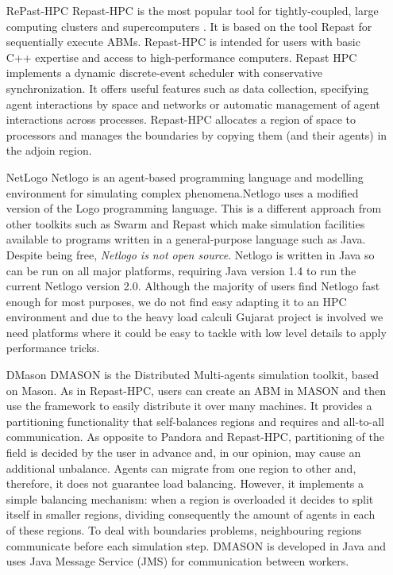 \documentclass[11pt,oneside,a4paper,openright]{report}
\begin{document}
\begin{enumerate}
\renewcommand{\labelitemi}{$\bullet$}
\renewcommand{\labelitemii}{$\cdot$}
\item[RePast-HPC]
Repast-HPC is the most popular tool for tightly-coupled, large computing clusters and
supercomputers \cite{CollierNorth2012}. It is based on the tool Repast for sequentially execute ABMs.
Repast-HPC is intended for users with basic C++ expertise and access to high-performance computers.
Repast HPC implements a dynamic discrete-event scheduler with conservative synchronization. It offers
useful features such as data collection, specifying agent interactions by space and networks or automatic
management of agent interactions across processes. Repast-HPC allocates a region of space to processors
and manages the boundaries by copying them (and their agents) in the adjoin region. 
\\
\item[NetLogo]
Netlogo\cite{netlogoCite} is an agent-based programming language and modelling environment for
simulating complex phenomena.Netlogo uses a modified version of the Logo programming language.
This is a different approach from other toolkits such as Swarm and Repast
which make simulation facilities available to programs written in a general-purpose
language such as Java. Despite being free, \emph{Netlogo is not open source}. Netlogo is
written in Java so can be run on all major platforms, requiring Java version 1.4 to
run the current Netlogo version 2.0. Although the majority of users find Netlogo
fast enough for most purposes, we do not find easy adapting it to an HPC environment and
due to the heavy load calculi Gujarat project is involved we need platforms where it could be
easy to tackle with low level details to apply performance tricks.
\\
\item[DMason]
DMASON is the Distributed Multi-agents simulation toolkit, based on Mason. As in Repast-HPC, users can create an ABM in MASON and then use the framework to easily distribute it over many machines. It provides a partitioning functionality that self-balances regions and requires and all-to-all communication. As opposite to Pandora and Repast-HPC, partitioning of the field is decided by the user in advance and, in our opinion, may cause an additional unbalance. Agents can migrate from one region to other and, therefore, it does not guarantee load balancing. However, it implements a simple balancing mechanism: when a region is overloaded it decides to split itself in smaller regions, dividing consequently the amount of agents in each of these regions. To deal with boundaries problems,
neighbouring regions communicate before each simulation step. DMASON is developed in Java and uses
Java Message Service (JMS) for communication between workers.


\end{enumerate}
\end{document}
